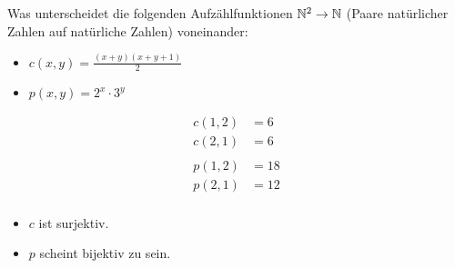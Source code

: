 \begin{card}
  Was unterscheidet die folgenden Aufzählfunktionen $\mathbb{N}^2 \rightarrow \mathbb{N}$ (Paare natürlicher Zahlen auf natürliche Zahlen) voneinander:
  \begin{itemize}
    \item $c(x, y) = \frac{(x + y)(x + y + 1)}{2}$
    \item $p(x, y) = 2^x \cdot 3^y$
  \end{itemize}
  \hr
  \begin{align*}
    c(1,2) &= 6 \\
    c(2,1) &= 6 \\
    \\
    p(1,2) &= 18 \\
    p(2,1) &= 12 \\
  \end{align*}

  \begin{itemize}
    \item $c$ ist surjektiv.
    \item $p$ scheint bijektiv zu sein.
  \end{itemize}
\end{card}

